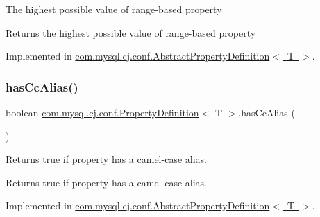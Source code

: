 The highest possible value of range-\/based property

\begin{DoxyReturn}{Returns}
the highest possible value of range-\/based property 
\end{DoxyReturn}


Implemented in \mbox{\hyperlink{classcom_1_1mysql_1_1cj_1_1conf_1_1_abstract_property_definition_ad5fda7a2939d0525ae139dcb9489a100}{com.\+mysql.\+cj.\+conf.\+Abstract\+Property\+Definition$<$ T $>$}}.

\mbox{\label{interfacecom_1_1mysql_1_1cj_1_1conf_1_1_property_definition_a665ced842d6e306f68c31df34587afca}} 
\subsubsection{\texorpdfstring{has\+Cc\+Alias()}{hasCcAlias()}}
{\footnotesize\ttfamily boolean \mbox{\hyperlink{interfacecom_1_1mysql_1_1cj_1_1conf_1_1_property_definition}{com.\+mysql.\+cj.\+conf.\+Property\+Definition}}$<$ T $>$.has\+Cc\+Alias (\begin{DoxyParamCaption}{ }\end{DoxyParamCaption})}

Returns true if property has a camel-\/case alias.

\begin{DoxyReturn}{Returns}
true if property has a camel-\/case alias. 
\end{DoxyReturn}


Implemented in \mbox{\hyperlink{classcom_1_1mysql_1_1cj_1_1conf_1_1_abstract_property_definition_a5c08adb553273bffe89b193a112c21d3}{com.\+mysql.\+cj.\+conf.\+Abstract\+Property\+Definition$<$ T $>$}}.

\mbox{\label{interfacecom_1_1mysql_1_1cj_1_1conf_1_1_property_definition_a8f2457ea9870439d45581873ff8f3855}} 
